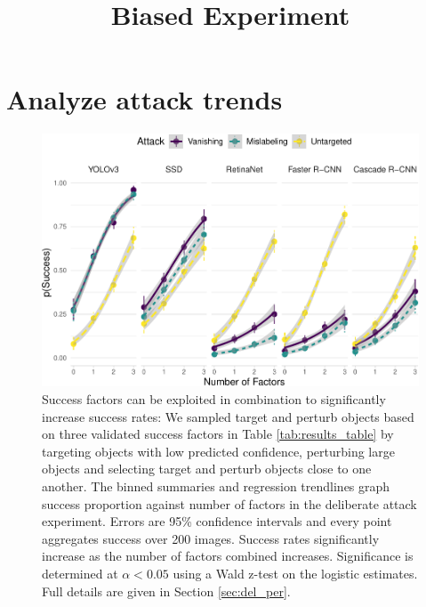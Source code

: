 \documentclass[
]{article}
\title{Biased Experiment}
\author{}
\date{\vspace{-2.5em}}
\begin{document}
\maketitle

\section{Analyze attack trends}\label{analyze-attack-trends}

\begin{figure}[tb]

{\centering \includegraphics[width=1\linewidth]{imgs/biased_trend_graph-1} 

}

\caption{Success factors can be exploited in combination to significantly increase success rates:  We sampled target and perturb objects based on three validated success factors in Table \ref{tab:results_table} by targeting objects with low predicted confidence, perturbing large objects and selecting target and perturb objects close to one another. The binned summaries and regression trendlines graph success proportion against number of factors in the deliberate attack experiment. Errors are 95\% confidence intervals and every point aggregates success over 200 images. Success rates significantly increase as the number of factors combined increases. Significance is determined at $\alpha < 0.05$ using a Wald z-test on the logistic estimates. Full details are given in Section \ref{sec:del_per}.}\label{fig:biased_trend_graph}
\end{figure}

\begingroup\fontsize{9}{11}\selectfont
\end{document}
